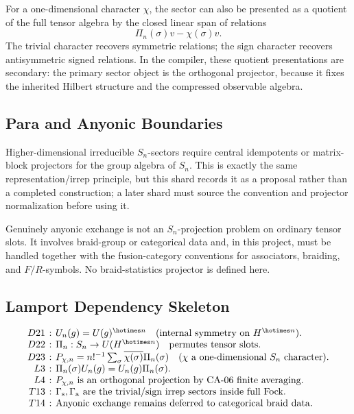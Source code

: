 For a one-dimensional character \(\chi\), the sector can also be presented as a
quotient of the full tensor algebra by the closed linear span of relations
\[
  \Pi_n(\sigma)v-\chi(\sigma)v.
\]
The trivial character recovers symmetric relations; the sign character recovers
antisymmetric signed relations.  In the compiler, these quotient presentations
are secondary: the primary sector object is the orthogonal projector, because it
fixes the inherited Hilbert structure and the compressed observable algebra.

\subsection{Para and Anyonic Boundaries}

Higher-dimensional irreducible \(S_n\)-sectors require central idempotents or
matrix-block projectors for the group algebra of \(S_n\).  This is exactly the
same representation/irrep principle, but this shard records it as a proposal
rather than a completed construction; a later shard must source the convention
and projector normalization before using it.

Genuinely anyonic exchange is not an \(S_n\)-projection problem on ordinary tensor
slots.  It involves braid-group or categorical data and, in this project, must be
handled together with the fusion-category conventions for associators, braiding,
and \(F/R\)-symbols.  No braid-statistics projector is defined here.

\subsection{Lamport Dependency Skeleton}

{\small
\[
\setlength{\arraycolsep}{2pt}
\begin{array}{rcl}
D21 &:& U_n(g)=U(g)^{\hotimes n}\quad\text{(internal symmetry on }H^{\hotimes n}).\\
D22 &:& \Pi_n:S_n\to U(H^{\hotimes n})\quad\text{permutes tensor slots}.\\
D23 &:& P_{\chi,n}=n!^{-1}\sum_{\sigma}\overline{\chi(\sigma)}\Pi_n(\sigma)
        \quad(\chi\text{ a one-dimensional }S_n\text{ character}).\\
L3 &:& \Pi_n(\sigma)U_n(g)=U_n(g)\Pi_n(\sigma).\\
L4 &:& P_{\chi,n}\text{ is an orthogonal projection by CA-06 finite averaging.}\\
T13 &:& \Gamma_{\mathrm s},\Gamma_{\mathrm a}\text{ are the trivial/sign irrep sectors inside full Fock.}\\
T14 &:& \text{Anyonic exchange remains deferred to categorical braid data.}
\end{array}
\]
}

